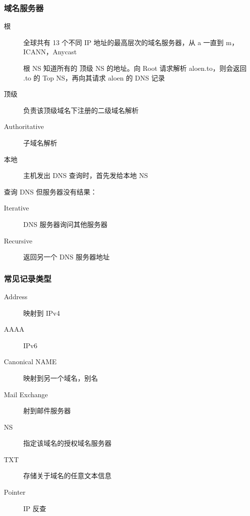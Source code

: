 \documentclass[11pt,journal,compsoc]{IEEEtran}
\begin{document}
\subsubsection{域名服务器}

\begin{description}
    \item[根] 全球共有 13 个不同 IP 地址的最高层次的域名服务器，从 a 一直到 m，ICANN，Anycast

    根 NS 知道所有的 顶级 NS 的地址。向 Root 请求解析 aloen.to，则会返回 .to 的 Top NS，再向其请求 aloen 的 DNS 记录

    \item[顶级] 负责该顶级域名下注册的二级域名解析

    \item[Authoritative] 子域名解析

    \item[本地] 主机发出 DNS 查询时，首先发给本地 NS
\end{description}

查询 DNS 但服务器没有结果：

\begin{description}
    \item[Iterative] DNS 服务器询问其他服务器
    \item[Recursive] 返回另一个 DNS 服务器地址
\end{description}


\subsubsection{常见记录类型}

\begin{description}
    \item[Address] 映射到 IPv4

    \item[AAAA] IPv6

    \item[Canonical NAME] 映射到另一个域名，别名

    \item[Mail Exchange] 射到邮件服务器

    \item[NS] 指定该域名的授权域名服务器

    \item[TXT] 存储关于域名的任意文本信息

    \item[Pointer] IP 反查
\end{description}
\end{document}
